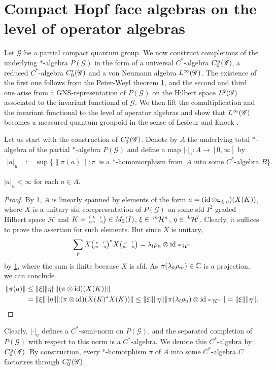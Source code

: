 \section{Compact Hopf face algebras on the level of operator algebras}


Let $\mathscr{G}$ be a partial compact quantum group. We now construct
completions of the underlying $*$-algebra $P(\mathscr{G})$ in the form
of a universal $C^{*}$-algebra $\CuG$, a reduced $C^{*}$-algebra
$\CrG$ and a von Neumann algebra $\LGinf$. The existence of the first
one follows from the Peter-Weyl theorem \ref{}, and the second and
third one arise from a GNS-representation of $P(\mathscr{G})$ on the
Hilbert space $\LGtwo$ associated to the invariant functional of
$\mathscr{G}$.  We then lift the comultiplication and the invariant
functional to the level of operator algebras and show that $\LGinf$
becomes a measured quantum groupoid in the sense of Lesieur \cite{}
and Enock \cite{}.

Let us start with the construction of $\CuG$. Denote by $A$ the
underlying total $*$-algebra of the partial $*$-algebra
$P(\mathscr{G})$ and define a map $|\cdot |_{u} \colon A \to [0,\infty]$ by
\begin{align*}
  |a|_{u}&:= \sup \{ \|\pi(a)\| : \pi \text{ is a $*$-homomorphism
    from } A \text{ into some $C^{*}$-algebra } B\}.
\end{align*}
\begin{Lem}
  $|a|_{u}<\infty$ for each $a \in A$. 
\end{Lem}
\begin{proof}
  By \ref{}, $A$ is linearly spanned by elements of the form $a=(\id \otimes
  \omega_{\xi,\eta})(X(K))$, where $X$ is a unitary sfd
  corepresentation of $P(\mathscr{G})$ on some sfd $I^{2}$-graded
  Hilbert space $\mathcal{H}$ and $K=\pmat{k}{l}{m}{n}\in M_{2}(I)$,
  $\xi\in \Gru{\mathcal{H}}{m}{n}$, $\eta\in \Gru{\mathcal{H}}{k}{l}$.
  Clearly, it suffices to prove the assertion for such elements. But
  since $X$ is unitary, 
  \begin{align*}
    \sum_{p}X\pmat{p}{l}{m}{n}^{*} X\pmat{p}{l}{m}{n}  = \lambda_{l}\rho_{n}
    \otimes \id_{\Gru{\mathcal{H}}{m}{n}}
  \end{align*}
  by \ref{}, where the sum is finite because $X$ is sfd. As
  $\pi(\lambda_{k}\rho_{m})\in \C$ is a projection, we can conclude
  \begin{align*}
    \|\pi(a)\| &\leq \| \xi| \|\eta\| \|(\pi \otimes \id)(X(K))\| \\
    &=\|\xi\|\|\eta\| \|(\pi \otimes \id)(X(K)^{*}X(K))\| \leq
    \|\xi\|\|\eta\| \|\pi(\lambda_{l}\rho_{n}) \otimes
    \id_{\Gru{\mathcal{H}}{m} {n}}\| = \|\xi\|\|\eta\|.  
  \end{align*}
\end{proof}
Clearly, $|\cdot|_{u}$ defines a $C^{*}$-semi-norm on
$P(\mathscr{G})$, and the separated completion of $P(\mathscr{G})$
with respect to this norm is a $C^{*}$-algebra. We denote this
$C^{*}$-algebra by $\CuG$. By construction, every $*$-homorphism $\pi$
of $A$ into some $C^{*}$-algebra $C$ factorises through $\CuG$.

